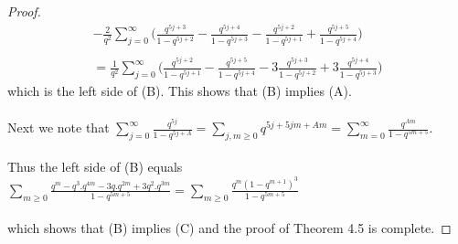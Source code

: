 \documentclass[10pt,reqno]{amsart}
\begin{document}
\begin{proof}
\begin{multline*}
    -\displaystyle\frac{2}{q^2}\displaystyle\sum_{j=0}^{\infty}\Bigg(\displaystyle\frac{q^{5j+3}}{1-q^{5j+2}}-\displaystyle\frac{q^{5j+4}}{1-q^{5j+3}}-\displaystyle\frac{q^{5j+2}}{1-q^{5j+1}}+\displaystyle\frac{q^{5j+5}}{1-q^{5j+4}}\Bigg)\\ \\
    =\displaystyle\frac{1}{q^2}\displaystyle\sum_{j=0}^{\infty}\Bigg(\displaystyle\frac{q^{5j+2}}{1-q^{5j+1}}-\displaystyle\frac{q^{5j+5}}{1-q^{5j+4}}-3\displaystyle\frac{q^{5j+3}}{1-q^{5j+2}}+3\displaystyle\frac{q^{5j+4}}{1-q^{5j+3}}\Bigg)
\end{multline*}
which is the left side of (B). This shows that (B) implies (A).\\ \\
Next we note that $\displaystyle\sum_{j=0}^{\infty}\displaystyle\frac{q^{5j}}{1-q^{5j+A}}=\displaystyle\sum_{j,m\geq 0}q^{5j+5jm+Am}=\displaystyle\sum_{m=0}^{\infty}\displaystyle\frac{q^{Am}}{1-q^{5m+5}}.$ \\ \\
Thus the left side of (B) equals $\displaystyle\sum_{m\geq 0}\displaystyle\frac{q^m-q^3.q^{4m}-3q.q^{2m}+3q^2.q^{3m}}{1-q^{5m+5}}=\displaystyle\sum_{m\geq 0}\displaystyle\frac{q^m(1-q^{m+1})^3}{1-q^{5m+5}}$\\ \\
which shows that (B) implies (C) and the proof of Theorem 4.5 is complete.
\end{proof}
\end{document}
